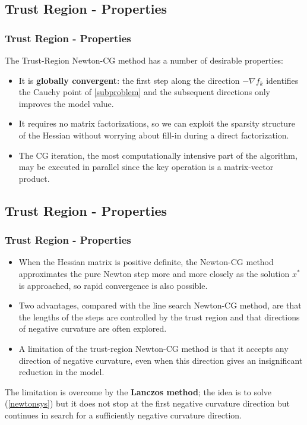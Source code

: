 \documentclass[professionalfont]{beamer}
\begin{document}
  \subsection{Trust Region - Properties}
  \begin{frame}
    \frametitle{Trust Region - Properties}
    The Trust-Region Newton-CG method has a number of desirable properties:
    \begin{itemize}
      \item It is \textbf{globally convergent}: the first step along the direction $-\nabla f_k$ identifies
        the Cauchy point of \ref{subproblem} and the subsequent directions only improves the model value.
      \item It requires no matrix factorizations, so we can exploit the sparsity structure of the Hessian
        without worrying about fill-in during a direct factorization.
      \item The CG iteration, the most computationally intensive part of the algorithm, may be executed in parallel
        since the key operation is a matrix-vector product.
    \end{itemize}
  \end{frame}

  \subsection{Trust Region - Properties}
  \begin{frame}
    \frametitle{Trust Region - Properties}
    \begin{itemize}
      \item When the Hessian matrix is positive definite, the Newton-CG method approximates the pure Newton step
        more and more closely as the solution $x^*$ is approached, so rapid convergence is also possible.
      \item Two advantages, compared with the line search Newton-CG method, are that the lengths of the steps are
        controlled by the trust region and that directions of negative curvature are often explored.
      \item A limitation of the trust-region Newton-CG method is that it accepts any direction of negative curvature,
        even when this direction gives an insignificant reduction in the model.
    \end{itemize}
    The limitation is overcome by the \textbf{Lanczos method}; the idea is to solve (\ref{newtonsys}) but it
    does not stop at the first negative curvature direction but continues in search for a sufficiently negative
    curvature direction.
  \end{frame}
\end{document}
